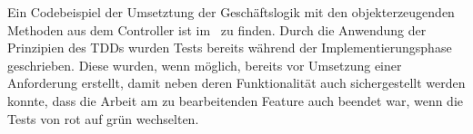 Ein Codebeispiel der Umsetztung der Geschäftslogik mit den objekterzeugenden Methoden aus dem Controller ist im~ zu finden. Durch die Anwendung der Prinzipien des \ac{TDD}s wurden Tests bereits während der Implementierungsphase geschrieben. Diese wurden, wenn möglich, bereits vor Umsetzung einer Anforderung erstellt, damit neben deren Funktionalität auch sichergestellt werden konnte, dass die Arbeit am zu bearbeitenden Feature auch beendet war, wenn die Tests von rot auf grün wechselten.







